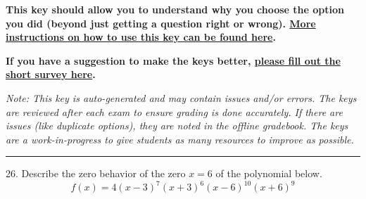 \documentclass{extbook}[14pt]
\begin{document}
\textbf{This key should allow you to understand why you choose the option you did (beyond just getting a question right or wrong). \href{https://xronos.clas.ufl.edu/mac1105spring2020/courseDescriptionAndMisc/Exams/LearningFromResults}{More instructions on how to use this key can be found here}.}

\textbf{If you have a suggestion to make the keys better, \href{https://forms.gle/CZkbZmPbC9XALEE88}{please fill out the short survey here}.}

\textit{Note: This key is auto-generated and may contain issues and/or errors. The keys are reviewed after each exam to ensure grading is done accurately. If there are issues (like duplicate options), they are noted in the offline gradebook. The keys are a work-in-progress to give students as many resources to improve as possible.}

\rule{\textwidth}{0.4pt}

26. Describe the zero behavior of the zero $x = 6$ of the polynomial below.
\[ f(x) = 4(x - 3)^{7}(x + 3)^{6}(x - 6)^{10}(x + 6)^{9} \] 
\end{document}
